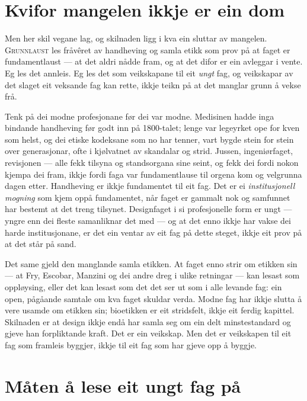 \section{Kvifor mangelen ikkje er ein dom}

Men her skil vegane lag, og skilnaden ligg i kva ein sluttar av mangelen. \textsc{Grunnlaust} les fråvêret av handheving og samla etikk som prov på at faget er fundamentlaust — at det aldri nådde fram, og at det difor er ein avleggar i vente. Eg les det annleis. Eg les det som veikskapane til eit \emph{ungt} fag, og veikskapar av det slaget eit veksande fag kan rette, ikkje teikn på at det manglar grunn å vekse frå.

Tenk på dei modne profesjonane før dei var modne. Medisinen hadde inga bindande handheving før godt inn på 1800-talet; lenge var legeyrket ope for kven som helst, og dei etiske kodeksane som no har tenner, vart bygde stein for stein over generasjonar, ofte i kjølvatnet av skandalar og strid. Jussen, ingeniørfaget, revisjonen — alle fekk tilsyna og standsorgana sine seint, og fekk dei fordi nokon kjempa dei fram, ikkje fordi faga var fundamentlause til orgena kom og velgrunna dagen etter. Handheving er ikkje fundamentet til eit fag. Det er ei \emph{institusjonell mogning} som kjem oppå fundamentet, når faget er gammalt nok og samfunnet har bestemt at det treng tilsynet. Designfaget i si profesjonelle form er ungt — yngre enn dei fleste samanliknar det med — og at det enno ikkje har vakse dei harde institusjonane, er det ein ventar av eit fag på dette steget, ikkje eit prov på at det står på sand.

Det same gjeld den manglande samla etikken. At faget enno strir om etikken sin — at Fry, Escobar, Manzini og dei andre dreg i ulike retningar — kan lesast som oppløysing, eller det kan lesast som det det ser ut som i alle levande fag: ein open, pågåande samtale om kva faget skuldar verda. Modne fag har ikkje slutta å vere usamde om etikken sin; bioetikken er eit stridsfelt, ikkje eit ferdig kapittel. Skilnaden er at design ikkje endå har samla seg om ein delt minstestandard og gjeve han forpliktande kraft. Det er ein veikskap. Men det er veikskapen til eit fag som framleis byggjer, ikkje til eit fag som har gjeve opp å byggje.

\section{Måten å lese eit ungt fag på}

